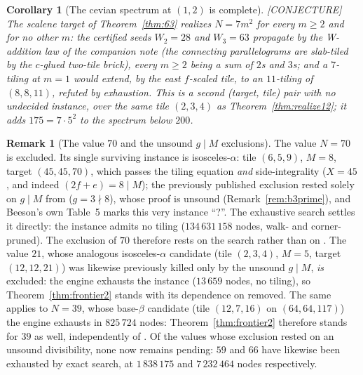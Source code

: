 \documentclass[11pt,reqno]{amsart}
\theoremstyle{plain}
\newtheorem{corollary}[theorem]{Corollary}
\theoremstyle{definition}
\newtheorem{remark}[theorem]{Remark}
\newcommand{\lab}[1]{\hfill\textnormal{\footnotesize\textsc{[#1]}}}
\begin{document}
\begin{corollary}[The cevian spectrum at $(1,2)$ is complete]\label{cor:wfamily}\lab{CONJECTURE}
The scalene target of Theorem~\ref{thm:63} realizes $N=7m^2$ for every $m\ge2$ and for no other
$m$: the certified seeds $W_2=28$ and $W_3=63$ propagate by the W-addition law of the companion
note (the connecting parallelograms are slab-tiled by the $c$-glued two-tile brick), every
$m\ge2$ being a sum of $2$s and $3$s; and a $7$-tiling at $m=1$ would extend, by the east
$f$-scaled tile, to an $11$-tiling of $(8,8,11)$, refuted by exhaustion. This is a second
(target, tile) pair with no undecided instance, over the same tile $(2,3,4)$ as
Theorem~\ref{thm:realize12}; it adds $175=7\cdot5^2$ to the spectrum below $200$.
\end{corollary}

\begin{remark}[The value $70$ and the unsound $g\mid M$ exclusions]\label{rem:seventy}
The value $N=70$ is excluded. Its single surviving instance is isosceles-$\alpha$: tile $(6,5,9)$,
$M=8$, target $(45,45,70)$, which passes the tiling equation \emph{and} side-integrality ($X=45$,
and indeed $(2f+e)=8\mid M$); the previously published exclusion rested solely on $g\mid M$ from
\cite[Thm.~19]{BeesonIII} ($g=3\nmid8$), whose proof is unsound (Remark~\ref{rem:b3prime}), and
Beeson's own Table~5 marks this very instance ``?''. The exhaustive search settles it directly:
the instance admits no tiling ($134\,631\,158$ nodes, walk- and corner-pruned). The exclusion of
$70$ therefore rests on the search rather than on \cite[Thm.~19]{BeesonIII}. The value
$21$, whose analogous isosceles-$\alpha$ candidate (tile $(2,3,4)$, $M=5$,
target $(12,12,21)$) was likewise previously killed only by the unsound $g\mid M$, \emph{is}
excluded: the engine exhausts the instance ($13\,659$ nodes, no tiling), so
Theorem~\ref{thm:frontier2} stands with its dependence on \cite[Thm.~19]{BeesonIII} removed. The
same applies to $N=39$, whose base-$\beta$ candidate (tile $(12,7,16)$ on $(64,64,117)$) the engine
exhausts in $825\,724$ nodes: Theorem~\ref{thm:frontier2} therefore stands for $39$ as well,
independently of \cite[Thm.~14]{BeesonIII}. Of the values whose exclusion rested on an unsound
divisibility, none now remains pending: $59$ and $66$ have likewise been exhausted by exact search,
at $1\,838\,175$ and $7\,232\,464$ nodes respectively.
\end{remark}
\end{document}
